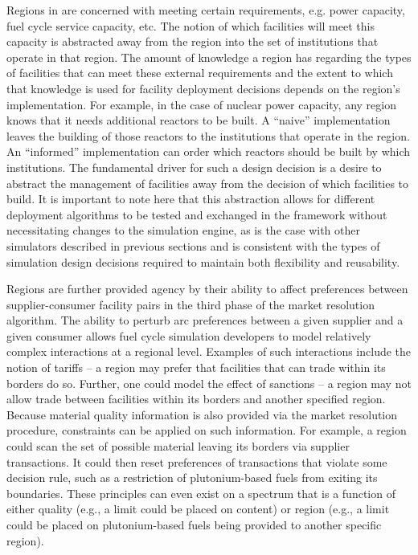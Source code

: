 Regions in \Cyclus are concerned with meeting certain requirements, e.g. power
capacity, fuel cycle service capacity, etc. The notion of which facilities will
meet this capacity is abstracted away from the region into the set of
institutions that operate in that region. The amount of knowledge a region has
regarding the types of facilities that can meet these external requirements and
the extent to which that knowledge is used for facility deployment decisions
depends on the region's implementation. For example, in the case of nuclear
power capacity, any region knows that it needs additional reactors to be
built. A ``naive'' implementation leaves the building of those reactors to the
institutions that operate in the region. An ``informed'' implementation can
order which reactors should be built by which institutions. The fundamental
driver for such a design decision is a desire to abstract the management of
facilities away from the decision of which facilities to build. It is important
to note here that this abstraction allows for different deployment algorithms to
be tested and exchanged in the \Cyclus framework without necessitating changes
to the simulation engine, as is the case with other simulators described in
previous sections and is consistent with the types of simulation design
decisions required to maintain both flexibility and reusability.

Regions are further provided agency by their ability to affect preferences
between supplier-consumer facility pairs in the third phase of the market
resolution algorithm. The ability to perturb arc preferences between a given
supplier and a given consumer allows fuel cycle simulation developers to model
relatively complex interactions at a regional level. Examples of such
interactions include the notion of tariffs -- a region may prefer that
facilities that can trade within its borders do so. Further, one could model the
effect of sanctions -- a region may not allow trade between facilities within
its borders and another specified region. Because material quality information
is also provided via the market resolution procedure, constraints can be
applied on such information. For example, a region could scan the set of
possible material leaving its borders via supplier transactions. It could then
reset preferences of transactions that violate some decision rule, such as a
restriction of plutonium-based fuels from exiting its boundaries. These
principles can even exist on a spectrum that is a function of either quality
(e.g., a limit could be placed on  content) or region (e.g., a
limit could be placed on plutonium-based fuels being provided to another
specific region).
